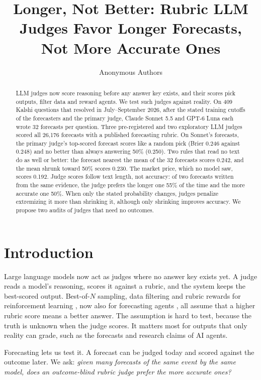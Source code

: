 \documentclass[letterpaper]{article} %
\title{Longer, Not Better: Rubric LLM Judges Favor Longer Forecasts, Not More Accurate Ones}
\author{Anonymous Authors}
\begin{document}
\maketitle

\begin{abstract}
LLM judges now score reasoning before any answer key exists, and their scores pick outputs, filter data and reward agents. We test such judges against reality. On 409 Kalshi questions that resolved in July--September 2026, after the stated training cutoffs of the forecasters and the primary judge, Claude Sonnet 5.5 and GPT-6 Luna each wrote 32 forecasts per question. Three pre-registered and two exploratory LLM judges scored all 26,176 forecasts with a published forecasting rubric. On Sonnet's forecasts, the primary judge's top-scored forecast scores like a random pick (Brier 0.246 against 0.248) and no better than always answering 50\% (0.250). Two rules that read no text do as well or better: the forecast nearest the mean of the 32 forecasts scores 0.242, and the mean shrunk toward 50\% scores 0.230. The market price, which no model saw, scores 0.192. Judge scores follow text length, not accuracy: of two forecasts written from the same evidence, the judge prefers the longer one 55\% of the time and the more accurate one 50\%. When only the stated probability changes, judges penalize extremizing it more than shrinking it, although only shrinking improves accuracy. We propose two audits of judges that need no outcomes.
\end{abstract}

\section{Introduction}
Large language models now act as judges where no answer key exists yet. A judge reads a model's reasoning, scores it against a rubric, and the system keeps the best-scored output. Best-of-$N$ sampling, data filtering and rubric rewards for reinforcement learning \citep{gunjal2025rubrics,viswanathan2025checklists}, now also for forecasting agents \citep{anonymous2026beliefstate}, all assume that a higher rubric score means a better answer. The assumption is hard to test, because the truth is unknown when the judge scores. It matters most for outputs that only reality can grade, such as the forecasts and research claims of AI agents.

Forecasting lets us test it. A forecast can be judged today and scored against the outcome later. We ask: \emph{given many forecasts of the same event by the same model, does an outcome-blind rubric judge prefer the more accurate ones?}
\end{document}
